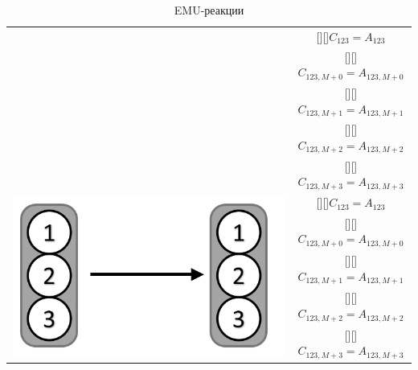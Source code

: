 \documentclass[14pt, a4paper]{extreport}
\newcommand{\adj}[1]{\raisebox{-2pt}[\height][\depth]{#1}}
\begin{document}
\begin{table}
\begin{center}
\begin{tabular}{c | c}
{\begin{minipage}{0.3\linewidth}
			 	\end{minipage}
			 } 
		     & \adj{$C_{123} = A_{123}$}\\[.5ex]
			 & \adj{$C_{123,M+0} = A_{123,M+0}$}\\ [.5ex]
			 & \adj{$C_{123,M+1} = A_{123,M+1}$}\\ [.5ex]
			 & \adj{$C_{123,M+2} = A_{123,M+2}$} \\ [.5ex]
			 & \adj{$C_{123,M+3} = A_{123,M+3}$} \\ [.5ex]
			 \hline 
			 \multirow{5}{*}[-1mm]{
			 	\begin{minipage}{0.3\linewidth}
			 		\centering{Унимолекулярная реакция}
			 		\includegraphics[scale=0.1]{EMU_reaction_3.png}
			 	\end{minipage}
			 } 
		     & \adj{$C_{123} = A_{123}$}\\[.5ex]
				& \adj{$C_{123,M+0} = A_{123,M+0}$}\\ [.5ex]
				& \adj{$C_{123,M+1} = A_{123,M+1}$}\\ [.5ex]
				& \adj{$C_{123,M+2} = A_{123,M+2}$} \\ [.5ex]
				& \adj{$C_{123,M+3} = A_{123,M+3}$} \\ [.5ex]
			 \hline 
		\end{tabular}
		\caption{EMU-реакции}
		\label{EMU_reactions}
	\end{center}
\end{table}
\end{document}
